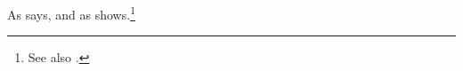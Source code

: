 \documentclass{article}
\begin{document}
As \citet{one} says, and as \citep{two} shows.\footnote{See also \citet{two}.}


\end{document}
